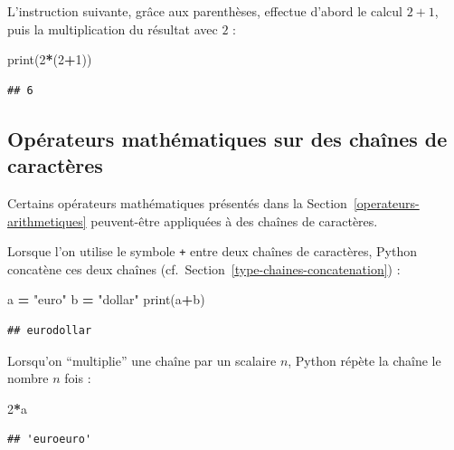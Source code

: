 \documentclass[
  12pt,
]{book}
\newenvironment{Shaded}{\begin{snugshade}}{\end{snugshade}}
\newcommand{\BuiltInTok}[1]{#1}
\newcommand{\DecValTok}[1]{\textcolor[rgb]{0.00,0.00,0.81}{#1}}
\newcommand{\NormalTok}[1]{#1}
\newcommand{\OperatorTok}[1]{\textcolor[rgb]{0.81,0.36,0.00}{\textbf{#1}}}
\newcommand{\StringTok}[1]{\textcolor[rgb]{0.31,0.60,0.02}{#1}}
\numberwithin{equation}{section}
\numberwithin{countremarque}{section}
\begin{document}
L'instruction suivante, grâce aux parenthèses, effectue d'abord le calcul \(2+1\), puis la multiplication du résultat avec \(2\) :

\begin{Shaded}
\begin{Highlighting}[]
\BuiltInTok{print}\NormalTok{(}\DecValTok{2}\OperatorTok{*}\NormalTok{(}\DecValTok{2}\OperatorTok{+}\DecValTok{1}\NormalTok{)) }
\end{Highlighting}
\end{Shaded}

\begin{lstlisting}
## 6
\end{lstlisting}

\subsection{Opérateurs mathématiques sur des chaînes de caractères}\label{opuxe9rateurs-mathuxe9matiques-sur-des-chauxeenes-de-caractuxe8res}

Certains opérateurs mathématiques présentés dans la Section~\ref{operateurs-arithmetiques} peuvent-être appliquées à des chaînes de caractères.

Lorsque l'on utilise le symbole \texttt{+} entre deux chaînes de caractères, Python concatène ces deux chaînes (cf.~Section~\ref{type-chaines-concatenation}) :

\begin{Shaded}
\begin{Highlighting}[]
\NormalTok{a }\OperatorTok{=} \StringTok{"euro"}
\NormalTok{b }\OperatorTok{=} \StringTok{"dollar"}
\BuiltInTok{print}\NormalTok{(a}\OperatorTok{+}\NormalTok{b)}
\end{Highlighting}
\end{Shaded}

\begin{lstlisting}
## eurodollar
\end{lstlisting}

Lorsqu'on ``multiplie'' une chaîne par un scalaire \(n\), Python répète la chaîne le nombre \(n\) fois :

\begin{Shaded}
\begin{Highlighting}[]
\DecValTok{2}\OperatorTok{*}\NormalTok{a}
\end{Highlighting}
\end{Shaded}

\begin{lstlisting}
## 'euroeuro'
\end{lstlisting}
\end{document}
